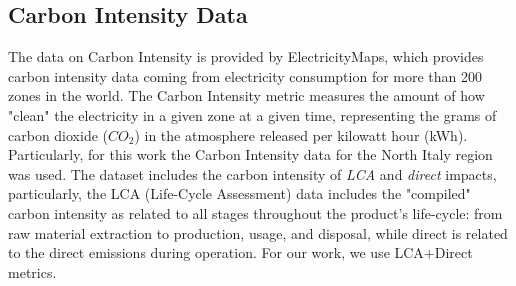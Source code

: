 \subsection{Carbon Intensity Data}
The data on Carbon Intensity is provided by ElectricityMaps, which provides carbon intensity data coming from electricity consumption for more than 200 zones in the world.
The Carbon Intensity metric measures the amount of how "clean" the electricity in a given zone at a given time, representing the grams of carbon dioxide ($CO_2$) in the atmosphere released per kilowatt hour (kWh).
Particularly, for this work the Carbon Intensity data for the North Italy region was used.
The dataset includes the carbon intensity of \textit{LCA} and \textit{direct} \cite{CarbonIntensity} impacts, particularly, the LCA (Life-Cycle Assessment) data includes the "compiled" carbon intensity as related to all stages throughout the product’s life-cycle:
from raw material extraction to production, usage, and disposal, while direct is related to the direct emissions during operation. For our work, we use LCA+Direct metrics.